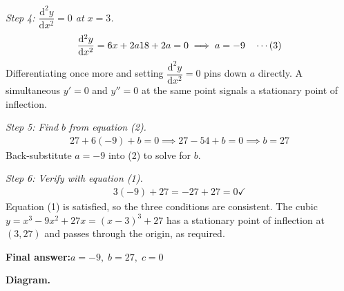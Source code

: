 \documentclass[11pt]{article}
\begin{document}
\textit{Step 4: \( \dfrac{\mathrm{d}^2y}{\mathrm{d}x^2} = 0 \) at \( x = 3 \).}
\[\begin{gathered}
\frac{\mathrm{d}^2y}{\mathrm{d}x^2} = 6x + 2a \newline 18 + 2a = 0 \implies a = -9 \quad \cdots (3)
\end{gathered}\]
Differentiating once more and setting \( \dfrac{\mathrm{d}^2y}{\mathrm{d}x^2} = 0 \) pins down \( a \) directly. A simultaneous \( y'=0 \) and \( y''=0 \) at the same point signals a stationary point of inflection.

\textit{Step 5: Find \( b \) from equation (2).}
\[\begin{gathered}
27 + 6(-9) + b = 0 \implies 27 - 54 + b = 0 \implies b = 27
\end{gathered}\]
Back-substitute \( a = -9 \) into (2) to solve for \( b \).

\textit{Step 6: Verify with equation (1).}
\[\begin{gathered}
3(-9) + 27 = -27 + 27 = 0 \checkmark
\end{gathered}\]
Equation (1) is satisfied, so the three conditions are consistent. The cubic \( y = x^3 - 9x^2 + 27x = (x-3)^3 + 27 \) has a stationary point of inflection at \( (3, 27) \) and passes through the origin, as required.

\begin{answerbox}
\textbf{Final answer:}\quad \(\displaystyle  a = -9,\; b = 27,\; c = 0 \)
\end{answerbox}
\textbf{Diagram.}
\end{document}
